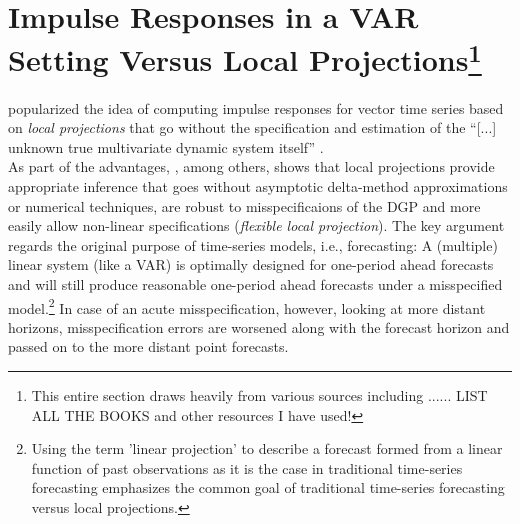 \documentclass[a4paper,11pt,listof=nochaptergap,oneside,pointednumbers,bibtotoc,bigheadings,liststotoc]{scrbook}
\theoremstyle{mysatz}
\theoremstyle{mydefinition}
\theoremstyle{mybemerkung}
\begin{document}
\section[Impulse Responses in a VAR Setting Versus Local Projections]{Impulse Responses in a VAR Setting Versus Local Projections\footnote{This entire section draws heavily from various sources including ...... LIST ALL THE BOOKS and other resources I have used!}}
\label{sec:IRFsVARversusLocalProj}
\citet{jorda:05} popularized the idea of computing impulse responses for vector time series based on \textit{local projections} that go without the specification and estimation of the ``[...] unknown true multivariate dynamic system itself'' \citep[p. 1]{jorda:05}. \\
As part of the advantages, \citet{jorda:05}, among others, shows that local projections provide appropriate inference that goes without asymptotic delta-method approximations or numerical techniques, are robust to misspecificaions of the DGP and more easily allow non-linear specifications (\textit{flexible local projection}). The key argument regards the original purpose of time-series models, i.e., forecasting: A (multiple) linear system (like a VAR) is optimally designed for one-period ahead forecasts and will still produce reasonable one-period ahead forecasts under a misspecified model.\footnote{Using the term 'linear projection' to describe a forecast formed from a linear function of past observations as it is the case in traditional time-series forecasting emphasizes the common goal of traditional time-series forecasting versus local projections.} In case of an acute misspecification, however, looking at more distant horizons, misspecification errors are worsened along with the forecast horizon and passed on to the more distant point forecasts. 
\end{document}
